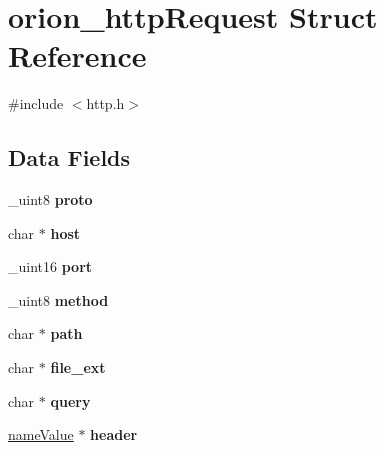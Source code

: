 \hypertarget{structorion__httpRequest}{
\section{orion\_\-httpRequest Struct Reference}
\label{structorion__httpRequest}
}


{\ttfamily \#include $<$http.h$>$}

\subsection*{Data Fields}
\begin{DoxyCompactItemize}
\item 
\hypertarget{structorion__httpRequest_a64bfaa516d428c86822d7f699a4b3fbd}{
\_\-uint8 {\bfseries proto}}
\label{structorion__httpRequest_a64bfaa516d428c86822d7f699a4b3fbd}

\item 
\hypertarget{structorion__httpRequest_ab899e4a0d9502a87d55dd2fc7787967f}{
char $\ast$ {\bfseries host}}
\label{structorion__httpRequest_ab899e4a0d9502a87d55dd2fc7787967f}

\item 
\hypertarget{structorion__httpRequest_aacfa6b224771298d4f9aa307e75cdae9}{
\_\-uint16 {\bfseries port}}
\label{structorion__httpRequest_aacfa6b224771298d4f9aa307e75cdae9}

\item 
\hypertarget{structorion__httpRequest_a691ee7358c2c7044f6afc00f839537a0}{
\_\-uint8 {\bfseries method}}
\label{structorion__httpRequest_a691ee7358c2c7044f6afc00f839537a0}

\item 
\hypertarget{structorion__httpRequest_ae7e83c1e229725ede948c04bd6716644}{
char $\ast$ {\bfseries path}}
\label{structorion__httpRequest_ae7e83c1e229725ede948c04bd6716644}

\item 
\hypertarget{structorion__httpRequest_a4cf693d1981aa9bda14320010e7c5e60}{
char $\ast$ {\bfseries file\_\-ext}}
\label{structorion__httpRequest_a4cf693d1981aa9bda14320010e7c5e60}

\item 
\hypertarget{structorion__httpRequest_a3282df4577d8ff490b6c98e2f5e09c08}{
char $\ast$ {\bfseries query}}
\label{structorion__httpRequest_a3282df4577d8ff490b6c98e2f5e09c08}

\item 
\hypertarget{structorion__httpRequest_a2bb44c21fd7f0c7e6f3cd181e80da379}{
\hyperlink{structnameValue}{nameValue} $\ast$ {\bfseries header}}
\label{structorion__httpRequest_a2bb44c21fd7f0c7e6f3cd181e80da379}


\end{DoxyCompactItemize}
